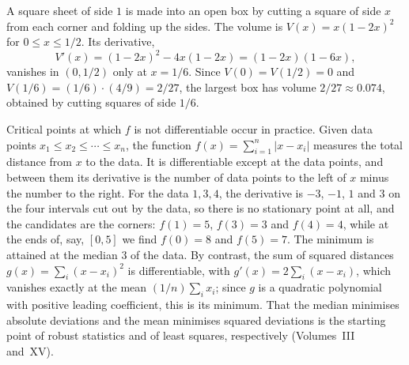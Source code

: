 \begin{figure}
\end{figure}

A square sheet of side $1$ is made into an open box by cutting a square of side $x$ from each corner and folding up the sides. The volume is $V(x)=x(1-2x)^2$ for $0\le x\le1/2$. Its derivative,
\[
V'(x)=(1-2x)^2-4x(1-2x)=(1-2x)(1-6x),
\]
vanishes in $(0,1/2)$ only at $x=1/6$. Since $V(0)=V(1/2)=0$ and $V(1/6)=(1/6)\cdot(4/9)=2/27$, the largest box has volume $2/27\approx0.074$, obtained by cutting squares of side $1/6$.

Critical points at which $f$ is not differentiable occur in practice. Given data points $x_1\le x_2\le\cdots\le x_n$, the function $f(x)=\sum_{i=1}^n|x-x_i|$ measures the total distance from $x$ to the data. It is differentiable except at the data points, and between them its derivative is the number of data points to the left of $x$ minus the number to the right. For the data $1,3,4$, the derivative is $-3$, $-1$, $1$ and $3$ on the four intervals cut out by the data, so there is no stationary point at all, and the candidates are the corners: $f(1)=5$, $f(3)=3$ and $f(4)=4$, while at the ends of, say, $[0,5]$ we find $f(0)=8$ and $f(5)=7$. The minimum is attained at the median $3$ of the data. By contrast, the sum of squared distances $g(x)=\sum_i(x-x_i)^2$ is differentiable, with $g'(x)=2\sum_i(x-x_i)$, which vanishes exactly at the mean $(1/n)\sum_ix_i$; since $g$ is a quadratic polynomial with positive leading coefficient, this is its minimum. That the median minimises absolute deviations and the mean minimises squared deviations is the starting point of robust statistics and of least squares, respectively (Volumes~III and~XV).

